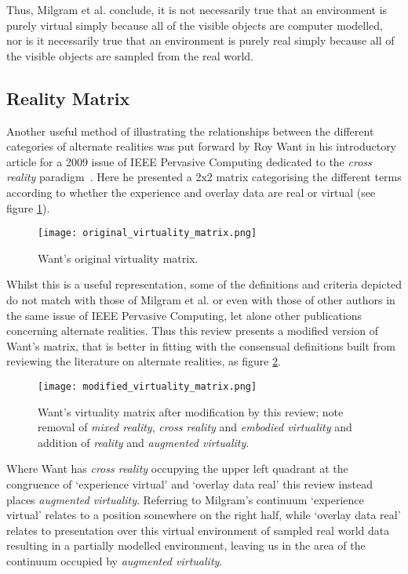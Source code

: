Thus, Milgram et al. conclude, it is not necessarily true that an environment is purely virtual simply because all of the visible objects are computer modelled, nor is it necessarily true that an environment is purely real simply because all of the visible objects are sampled from the real world.

\subsection{Reality Matrix}
\label{subsec:reality_matrix}
Another useful method of illustrating the relationships between the different categories of alternate realities was put forward by Roy Want in his introductory article for a 2009 issue of IEEE Pervasive Computing dedicated to the \textit{cross reality} paradigm~\cite{Want2009}. Here he presented a 2x2 matrix categorising the different terms according to whether the experience and overlay data are real or virtual (see figure \ref{original_virtuality_matrix.png}).

\begin{figure}[h]
\centering
\texttt{[image: original\_virtuality\_matrix.png]}
\caption{Want's original virtuality matrix.}
\label{original_virtuality_matrix.png}
\end{figure}

Whilst this is a useful representation, some of the definitions and criteria depicted do not match with those of Milgram et al. or even with those of other authors in the same issue of IEEE Pervasive Computing, let alone other publications concerning alternate realities. Thus this review presents a modified version of Want's matrix, that is better in fitting with the consensual definitions built from reviewing the literature on alternate realities, as figure \ref{modified_virtuality_matrix.png}.

\begin{figure}[h]
\centering
\texttt{[image: modified\_virtuality\_matrix.png]}
\caption{Want's virtuality matrix after modification by this review; note removal of \textit{mixed reality}, \textit{cross reality} and \textit{embodied virtuality} and addition of \textit{reality} and \textit{augmented virtuality}.}
\label{modified_virtuality_matrix.png}
\end{figure}

Where Want has \textit{cross reality} occupying the upper left quadrant at the congruence of `experience virtual' and `overlay data real' this review instead places \textit{augmented virtuality}. Referring to Milgram's continuum `experience virtual' relates to a position somewhere on the right half, while `overlay data real' relates to presentation over this virtual environment of sampled real world data resulting in a partially modelled environment, leaving us in the area of the continuum occupied by \textit{augmented virtuality}.

